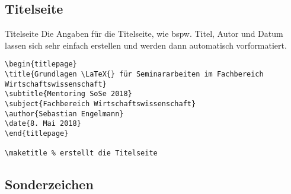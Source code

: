 \subsection{Titelseite}
\begin{frame}[fragile]{Titelseite}
Die Angaben für die Titelseite, wie bspw. Titel, Autor und Datum lassen sich sehr einfach erstellen und werden dann automatisch vorformatiert.

\begin{lstlisting}[style=tex]
\begin{titlepage}
\title{Grundlagen \LaTeX{} für Seminararbeiten im Fachbereich Wirtschaftswissenschaft}
\subtitle{Mentoring SoSe 2018}
\subject{Fachbereich Wirtschaftswissenschaft}
\author{Sebastian Engelmann}
\date{8. Mai 2018}
\end{titlepage}

\maketitle % erstellt die Titelseite
\end{lstlisting}


% 
% 

% 

% 
\end{frame}

\subsection{Sonderzeichen}

